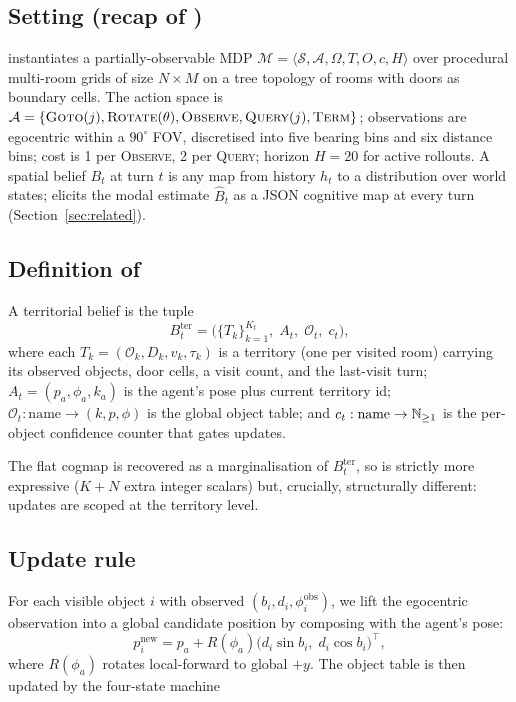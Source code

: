 \subsection{Setting (recap of \tos)}

\tos instantiates a partially-observable MDP
$\mathcal{M} = \langle\mathcal{S},\mathcal{A},\Omega,T,O,c,H\rangle$ over
procedural multi-room grids of size $N\times M$ on a tree topology of
rooms with doors as boundary cells. The action space is
$\mathcal{A} = \{\textsc{Goto}(j),\textsc{Rotate}(\theta),\textsc{Observe},\textsc{Query}(j),\textsc{Term}\}$;
observations are egocentric within a $90^{\circ}$ FOV, discretised into
five bearing bins and six distance bins; cost is 1 per \textsc{Observe},
2 per \textsc{Query}; horizon $H{=}20$ for active rollouts. A spatial
belief $B_t$ at turn $t$ is any map from history $h_t$ to a
distribution over world states; \tos elicits the modal estimate
$\hat B_t$ as a JSON cognitive map at every turn (Section~\ref{sec:related}).

\subsection{Definition of \tb}

\begin{definition}\label{def:tb}
A territorial belief is the tuple
\[
B^{\mathrm{ter}}_t = \big( \{T_k\}_{k=1}^{K_t},\; A_t,\; \mathcal{O}_t,\; c_t \big),
\]
where each $T_k = (\mathcal{O}_k, D_k, v_k, \tau_k)$ is a territory
(one per visited room) carrying its observed objects, door cells, a
visit count, and the last-visit turn; $A_t = (p_a, \phi_a, k_a)$ is
the agent's pose plus current territory id;
$\mathcal{O}_t : \mathrm{name}\to(k,p,\phi)$ is the global object
table; and $c_t : \mathrm{name}\to\mathbb{N}_{\ge 1}$ is the per-object
confidence counter that gates updates.
\end{definition}

The flat \tos cogmap is recovered as a marginalisation of
$B^{\mathrm{ter}}_t$, so \tb is strictly more expressive
($K{+}N$ extra integer scalars) but, crucially, structurally different:
updates are scoped at the territory level.

\subsection{Update rule}\label{sec:update}

For each visible object $i$ with observed $(b_i, d_i, \phi_i^{\mathrm{obs}})$,
we lift the egocentric observation into a global candidate
position by composing with the agent's pose:
\[
p_i^{\mathrm{new}} = p_a + R(\phi_a)\big(d_i \sin b_i,\; d_i \cos b_i\big)^{\!\top},
\]
where $R(\phi_a)$ rotates local-forward to global $+y$. The object
table is then updated by the four-state machine

